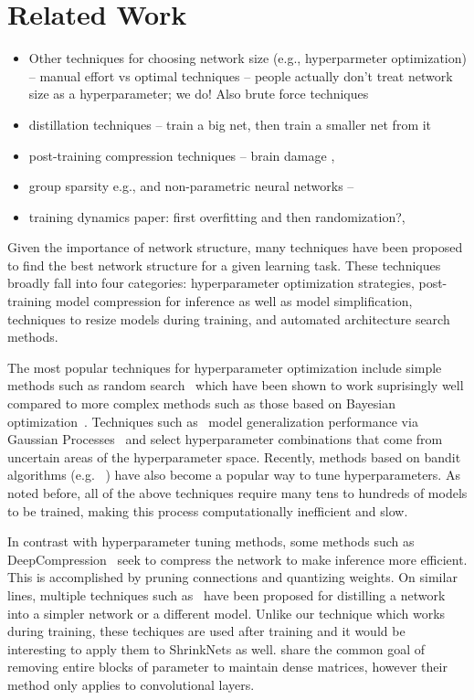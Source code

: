 \section{Related Work}

\begin{itemize}
  \item Other techniques for choosing network size (e.g., hyperparmeter optimization) -- manual effort vs optimal techniques -- people actually don't treat network size as a hyperparameter;  we do!  Also brute force techniques~\cite{nvidia-paper-xxx}
  \item distillation techniques -- train a big net, then train a smaller net from it 
  \item post-training compression techniques -- brain damage , 
  \item group sparsity e.g., \cite{Scardapane2017} and non-parametric neural networks -- 
  \item training dynamics paper: first overfitting and then randomization?, 
\end{itemize}

Given the importance of network structure, many techniques have been proposed
to find the best network structure for a given learning task.  These techniques
broadly fall into four categories: hyperparameter optimization strategies,
post-training model compression for inference as well as model simplification,
techniques to resize models during training, and automated architecture search
methods.

The most popular techniques for hyperparameter optimization include simple
methods such as random search~\cite{BergstraJAMESBERGSTRA2012} which have been
shown to work suprisingly well compared to more complex methods such as those
based on Bayesian optimization~\cite{Snoek12}.  Techniques such
as~\cite{Snoek12} model generalization performance via Gaussian
Processes~\cite{GaussianProcesses} and select hyperparameter combinations that
come from uncertain areas of the hyperparameter space.  Recently, methods based
on bandit algorithms (e.g. ~\cite{li2016hyperband, jamieson2016}) have also
become a popular way to tune hyperparameters.  As noted before, all of the
above techniques require many tens to hundreds of models to be trained, making
this process computationally inefficient and slow.

In contrast with hyperparameter tuning methods, some methods such as
DeepCompression~\cite{han2015deepcompression} seek to compress the network to
make inference more efficient.  This is accomplished by pruning connections and
quantizing weights.  On similar lines, multiple techniques such
as~\cite{romero2014fitnets, hinton2015distilling} have been proposed for
distilling a network into a simpler network or a different model.  Unlike our
technique which works during training, these techiques are used after training
and it would be interesting to apply them to ShrinkNets as well. \cite{Abadi2016b} share the common goal of removing entire blocks of parameter to maintain dense matrices, however their method only applies to convolutional layers.

